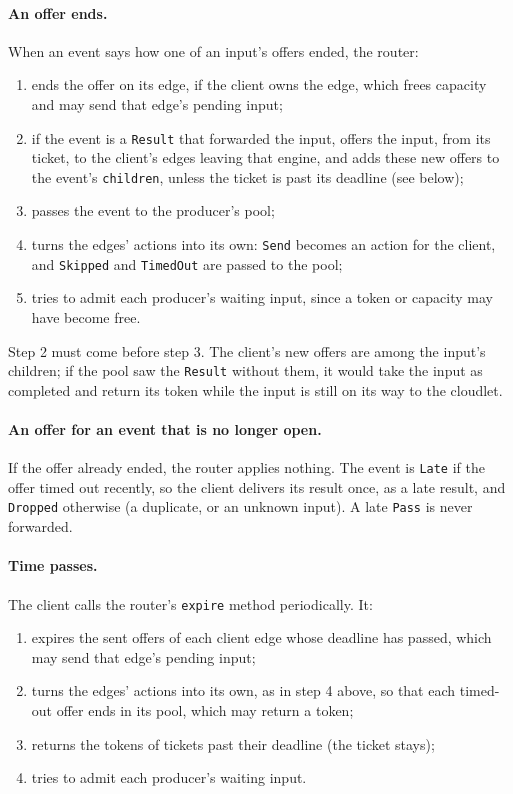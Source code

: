 \documentclass[11pt]{article}
\newcommand{\code}[1]{\texttt{#1}}
\begin{document}
\paragraph{An offer ends.} When an event says how one of an input's offers
ended, the router:
\begin{enumerate}[nosep]
  \item ends the offer on its edge, if the client owns the edge, which frees
        capacity and may send that edge's pending input;
  \item if the event is a \code{Result} that forwarded the input, offers the
        input, from its ticket, to the client's edges leaving that engine,
        and adds these new offers to the event's \code{children}, unless the
        ticket is past its deadline (see below);
  \item passes the event to the producer's pool;
  \item turns the edges' actions into its own: \code{Send} becomes an action
        for the client, and \code{Skipped} and \code{TimedOut} are passed to
        the pool;
  \item tries to admit each producer's waiting input, since a token or
        capacity may have become free.
\end{enumerate}
Step 2 must come before step 3. The client's new offers are among the
input's children; if the pool saw the \code{Result} without them, it would
take the input as completed and return its token while the input is still on
its way to the cloudlet.

\paragraph{An offer for an event that is no longer open.} If the offer
already ended, the router applies nothing. The event is \code{Late} if the
offer timed out recently, so the client delivers its result once, as a late
result, and \code{Dropped} otherwise (a duplicate, or an unknown input). A late
\code{Pass} is never forwarded.

\paragraph{Time passes.} The client calls the router's \code{expire} method
periodically. It:
\begin{enumerate}[nosep]
  \item expires the sent offers of each client edge whose deadline has passed,
        which may send that edge's pending input;
  \item turns the edges' actions into its own, as in step 4 above, so that
        each timed-out offer ends in its pool, which may return a token;
  \item returns the tokens of tickets past their deadline (the ticket stays);
  \item tries to admit each producer's waiting input.
\end{enumerate}
\end{document}
